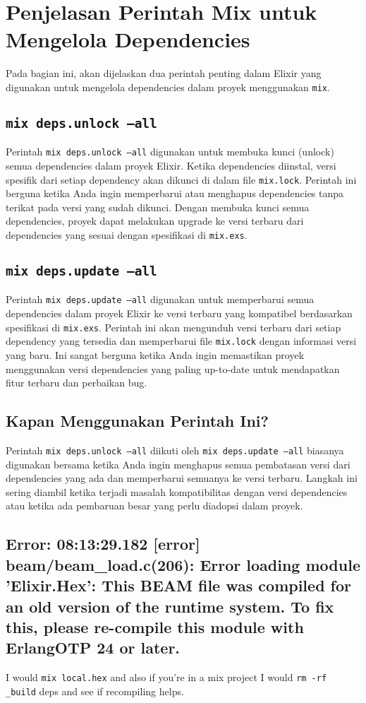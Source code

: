 
\chapter{Penjelasan Perintah Mix untuk Mengelola Dependencies}

Pada bagian ini, akan dijelaskan dua perintah penting dalam Elixir yang digunakan untuk mengelola dependencies dalam proyek menggunakan \texttt{mix}.

\section{\texttt{mix deps.unlock --all}}

Perintah \texttt{mix deps.unlock --all} digunakan untuk membuka kunci (unlock) semua dependencies dalam proyek Elixir. Ketika dependencies diinstal, versi spesifik dari setiap dependency akan dikunci di dalam file \texttt{mix.lock}. Perintah ini berguna ketika Anda ingin memperbarui atau menghapus dependencies tanpa terikat pada versi yang sudah dikunci. Dengan membuka kunci semua dependencies, proyek dapat melakukan upgrade ke versi terbaru dari dependencies yang sesuai dengan spesifikasi di \texttt{mix.exs}.

\section{\texttt{mix deps.update --all}}

Perintah \texttt{mix deps.update --all} digunakan untuk memperbarui semua dependencies dalam proyek Elixir ke versi terbaru yang kompatibel berdasarkan spesifikasi di \texttt{mix.exs}. Perintah ini akan mengunduh versi terbaru dari setiap dependency yang tersedia dan memperbarui file \texttt{mix.lock} dengan informasi versi yang baru. Ini sangat berguna ketika Anda ingin memastikan proyek menggunakan versi dependencies yang paling up-to-date untuk mendapatkan fitur terbaru dan perbaikan bug.

\section{Kapan Menggunakan Perintah Ini?}

Perintah \texttt{mix deps.unlock --all} diikuti oleh \texttt{mix deps.update --all} biasanya digunakan bersama ketika Anda ingin menghapus semua pembatasan versi dari dependencies yang ada dan memperbarui semuanya ke versi terbaru. Langkah ini sering diambil ketika terjadi masalah kompatibilitas dengan versi dependencies atau ketika ada pembaruan besar yang perlu diadopsi dalam proyek.

\section{Error: 08:13:29.182 [error] beam/beam\_load.c(206): Error loading module 'Elixir.Hex':
	This BEAM file was compiled for an old version of the runtime system.
	To fix this, please re-compile this module with Erlang\/OTP 24 or later.}

I would \texttt{mix local.hex} and also if you’re in a mix project I would \texttt{rm -rf \_build} deps and see if recompiling helps.
\
